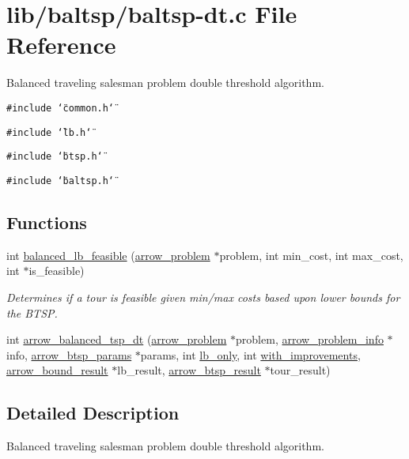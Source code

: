 \hypertarget{lib_2baltsp_2baltsp-dt_8c}{
\section{lib/baltsp/baltsp-dt.c File Reference}
\label{lib_2baltsp_2baltsp-dt_8c}
}
Balanced traveling salesman problem double threshold algorithm.  


{\tt \#include \char`\"{}common.h\char`\"{}}\par
{\tt \#include \char`\"{}lb.h\char`\"{}}\par
{\tt \#include \char`\"{}btsp.h\char`\"{}}\par
{\tt \#include \char`\"{}baltsp.h\char`\"{}}\par
\subsection*{Functions}
\begin{CompactItemize}
\item 
int \hyperlink{lib_2baltsp_2baltsp-dt_8c_9428697bd562becac6ddd6fa733bbe81}{balanced\_\-lb\_\-feasible} (\hyperlink{structarrow__problem}{arrow\_\-problem} $\ast$problem, int min\_\-cost, int max\_\-cost, int $\ast$is\_\-feasible)
\begin{CompactList}\small\item\em Determines if a tour is feasible given min/max costs based upon lower bounds for the BTSP. \item\end{CompactList}\item 
int \hyperlink{lib_2baltsp_2baltsp-dt_8c_abd717f64120ef3834dcdc1c8c98e336}{arrow\_\-balanced\_\-tsp\_\-dt} (\hyperlink{structarrow__problem}{arrow\_\-problem} $\ast$problem, \hyperlink{structarrow__problem__info}{arrow\_\-problem\_\-info} $\ast$info, \hyperlink{structarrow__btsp__params}{arrow\_\-btsp\_\-params} $\ast$params, int \hyperlink{bin_2baltsp-ib_8c_f328dea7847a1b1888dc14a570d0ec45}{lb\_\-only}, int \hyperlink{bin_2baltsp-ib2_8c_91079460b00ac08193d5ee47094f8f70}{with\_\-improvements}, \hyperlink{structarrow__bound__result}{arrow\_\-bound\_\-result} $\ast$lb\_\-result, \hyperlink{structarrow__btsp__result}{arrow\_\-btsp\_\-result} $\ast$tour\_\-result)
\end{CompactItemize}


\subsection{Detailed Description}
Balanced traveling salesman problem double threshold algorithm. 

